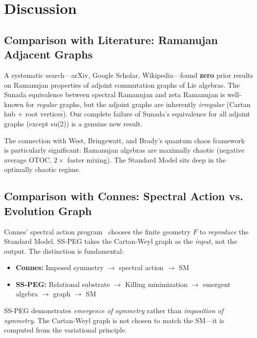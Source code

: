 \section{Discussion}\label{sec:discussion}

\subsection{Comparison with Literature: Ramanujan Adjacent Graphs}\label{sec:lit_comparison}

A systematic search---arXiv, Google Scholar, Wikipedia---found \textbf{zero} prior results on Ramanujan properties of adjoint commutation graphs of Lie algebras. The Sunada equivalence between spectral Ramanujan and zeta Ramanujan is well-known for \emph{regular} graphs, but the adjoint graphs are inherently \emph{irregular} (Cartan hub + root vertices). Our complete failure of Sunada's equivalence for all adjoint graphs (except su(2)) is a genuine new result.

The connection with West, Bringewatt, and Brady's quantum chaos framework~\cite{west2025quantum} is particularly significant: Ramanujan algebras are maximally chaotic (negative average OTOC, $2\times$ faster mixing). The Standard Model sits deep in the optimally chaotic regime.

\subsection{Comparison with Connes: Spectral Action vs. Evolution Graph}\label{sec:connes_comparison}

Connes' spectral action program~\cite{connes1994noncommutative,chamseddine1997spectral} chooses the finite geometry $F$ to \emph{reproduce} the Standard Model. SS-PEG takes the Cartan-Weyl graph as the \emph{input}, not the output. The distinction is fundamental:

\begin{itemize}
    \item \textbf{Connes:} Imposed symmetry $\to$ spectral action $\to$ SM
    \item \textbf{SS-PEG:} Relational substrate $\to$ Killing minimization $\to$ emergent algebra $\to$ graph $\to$ SM
\end{itemize}

SS-PEG demonstrates \emph{emergence of symmetry} rather than \emph{imposition of symmetry}. The Cartan-Weyl graph is not chosen to match the SM---it is computed from the variational principle.

